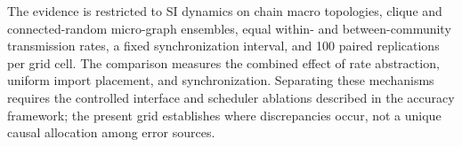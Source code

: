 \documentclass[a4paper,fleqn]{cas-sc}
\begin{document}
The evidence is restricted to SI dynamics on chain macro topologies, clique and connected-random micro-graph ensembles, equal within- and between-community transmission rates, a fixed synchronization interval, and 100 paired replications per grid cell.  The comparison measures the combined effect of rate abstraction, uniform import placement, and synchronization.  Separating these mechanisms requires the controlled interface and scheduler ablations described in the accuracy framework; the present grid establishes where discrepancies occur, not a unique causal allocation among error sources.




\end{document}
